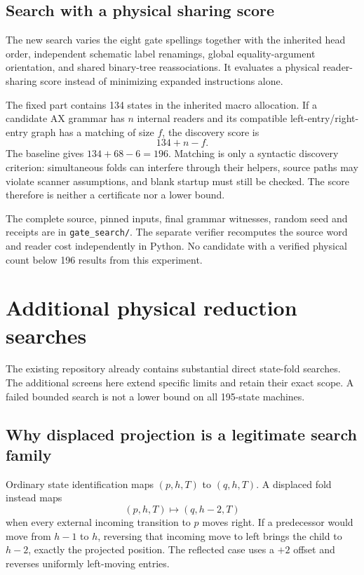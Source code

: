 \documentclass[11pt,letterpaper]{article}
\newcommand{\file}[1]{\texttt{\nolinkurl{#1}}}
\begin{document}
\subsection{Search with a physical sharing score}

The new search varies the eight gate spellings together with the inherited
head order, independent schematic label renamings, global equality-argument
orientation, and shared binary-tree reassociations. It evaluates a physical
reader-sharing score instead of minimizing expanded instructions alone.

The fixed part contains 134 states in the inherited macro allocation. If a
candidate AX grammar has $n$ internal readers and its compatible
left-entry/right-entry graph has a matching of size $f$, the discovery score
is
\[
 134+n-f.
\]
The baseline gives $134+68-6=196$. Matching is only a syntactic discovery
criterion: simultaneous folds can interfere through their helpers, source
paths may violate scanner assumptions, and blank startup must still be
checked. The score therefore is neither a certificate nor a lower bound.



The complete source, pinned inputs, final grammar witnesses, random seed and
receipts are in \file{gate_search/}. The separate verifier recomputes
the source word and reader cost independently in Python. No candidate with
a verified physical count below 196 results from this experiment.

\section{Additional physical reduction searches}

The existing repository already contains substantial direct state-fold
searches. The additional screens here extend specific limits and retain
their exact scope. A failed bounded search is not a lower bound on all
195-state machines.



\subsection{Why displaced projection is a legitimate search family}

Ordinary state identification maps $(p,h,T)$ to $(q,h,T)$. A displaced fold
instead maps
\[
 (p,h,T)\longmapsto(q,h-2,T)
\]
when every external incoming transition to $p$ moves right. If a predecessor
would move from $h-1$ to $h$, reversing that incoming move to left brings the
child to $h-2$, exactly the projected position. The reflected case uses a
$+2$ offset and reverses uniformly left-moving entries.
\end{document}
